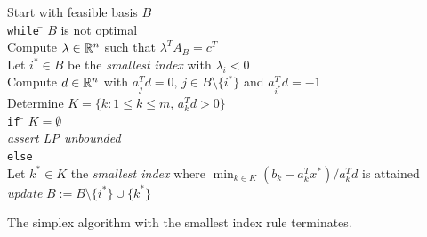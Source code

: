 \begin{algorithm}
 \begin{tabbing}
      Start with feasible basis $B$ \\[1ex]
      {\tt while} \= $B$ is not optimal \\ [.7ex]
      \> Compute $\lambda \in \mathbb{R}^n$ such that $\lambda^TA_B = c^T$ \\
      \> Let $i^* \in B$ be the \emph{ smallest index} with $\lambda_i<0$ \\
      \> Compute  $d \in \mathbb{R}^n$ with $a_j^T d = 0, \, j \in B \setminus\{i^*\}$
      and $a_{i^*}^T d = -1$ \\ 
      \> Determine $K = \{ k \colon 1 \leq k \leq m, \, a_k^Td >0\}$\\[.7ex]  
      \> {\tt if} \= $K = \emptyset$ \\   
      \> \> \emph{assert LP unbounded} \\
      \> {\tt else} \\
      \> \> Let $k^* \in K$ the \emph{smallest index} where 
     $
        \displaystyle \min_{k \in K} (b_k - a_k^Tx^*)/a_k^Td
      $
      is attained \\ %

      \> \>\emph{update} $B := B \setminus\{i^*\} \cup \{k^*\}$             
    \end{tabbing}
    
  \end{algorithm}
  



  \begin{theorem}
    \label{thr:3}
    The simplex algorithm with the smallest index rule terminates. 
  \end{theorem}

